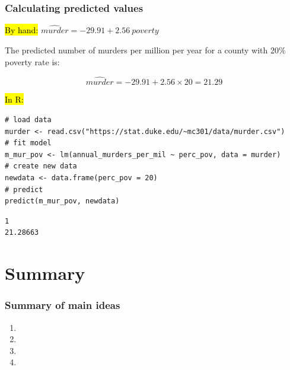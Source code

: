 \documentclass[11pt,containsverbatim,handout,xcolor=xelatex,dvipsnames,table]{beamer}
\begin{document}

\begin{frame}[fragile]
\frametitle{Calculating predicted values}

\hl{By hand:} $\widehat{murder} = -29.91 + 2.56~poverty$

The predicted number of murders per million per year for a county with 20\% poverty rate is: 

\pause

\[ \widehat{murder} = -29.91 + 2.56 \times 20 = 21.29 \]

\vfill

\pause

\hl{In R:}

{\scriptsize
\begin{Verbatim}[frame=single, formatcom=\color{blue}]
# load data
murder <- read.csv("https://stat.duke.edu/~mc301/data/murder.csv")
# fit model
m_mur_pov <- lm(annual_murders_per_mil ~ perc_pov, data = murder)
# create new data
newdata <- data.frame(perc_pov = 20)
# predict
predict(m_mur_pov, newdata)
\end{Verbatim}
}

\pause

{\scriptsize
\begin{Verbatim}[frame=single, formatcom=\color{gray}]
       1 
21.28663 
\end{Verbatim}
}

\end{frame}


\section{Summary}


\begin{frame}
\frametitle{Summary of main ideas}

\vfill

\begin{enumerate}

\item {}

\item {}

\item {}

\item {}

\end{enumerate}

\vfill

\end{frame}

\end{document}
